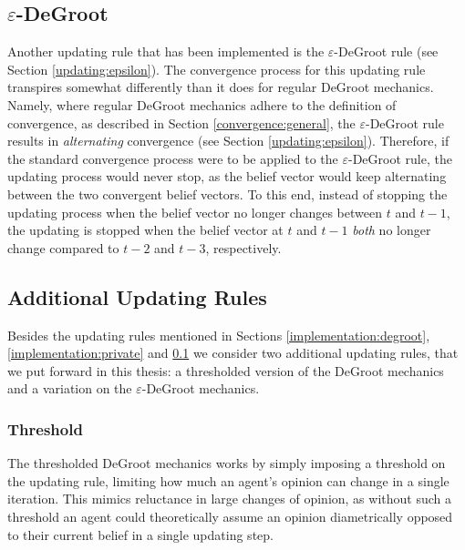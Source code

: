 \documentclass[a4paper, 12pt]{report}
\begin{document}
\subsection{$\varepsilon$-DeGroot}
\label{implementation:epsilon}
Another updating rule that has been implemented is the $\varepsilon$-DeGroot rule (see Section \ref{updating:epsilon}). The convergence process for this updating rule transpires somewhat differently than it does for regular DeGroot mechanics. Namely, where regular DeGroot mechanics adhere to the definition of convergence, as described in Section \ref{convergence:general}, the $\varepsilon$-DeGroot rule results in \emph{alternating} convergence (see Section \ref{updating:epsilon}). Therefore, if the standard convergence process were to be applied to the $\varepsilon$-DeGroot rule, the updating process would never stop, as the belief vector would keep alternating between the two convergent belief vectors. To this end, instead of stopping the updating process when the belief vector no longer changes between $t$ and $t-1$, the updating is stopped when the belief vector at $t$ and $t-1$ \emph{both} no longer change compared to $t-2$ and $t-3$, respectively. 


\subsection{Additional Updating Rules}

Besides the updating rules mentioned in Sections \ref{implementation:degroot}, \ref{implementation:private} and \ref{implementation:epsilon} we consider two additional updating rules, that we put forward in this thesis: a thresholded version of the DeGroot mechanics and a variation on the $\varepsilon$-DeGroot mechanics.

\subsubsection{Threshold}
\label{implementation:threshold}
The thresholded DeGroot mechanics works by simply imposing a threshold on the updating rule, limiting how much an agent's opinion can change in a single iteration. This mimics reluctance in large changes of opinion, as without such a threshold an agent could theoretically assume an opinion diametrically opposed to their current belief in a single updating step.
\end{document}

